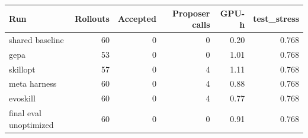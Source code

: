 \begin{tabular}{lrrrrr}
\toprule
Run & Rollouts & Accepted & Proposer calls & GPU-h & test\_stress \\
\midrule
shared baseline & 60 & 0 & 0 & 0.20 & 0.768 \\
gepa & 53 & 0 & 0 & 1.01 & 0.768 \\
skillopt & 57 & 0 & 4 & 1.11 & 0.768 \\
meta harness & 60 & 0 & 4 & 0.88 & 0.768 \\
evoskill & 60 & 0 & 4 & 0.77 & 0.768 \\
final eval unoptimized & 60 & 0 & 0 & 0.91 & 0.768 \\
\bottomrule
\end{tabular}
